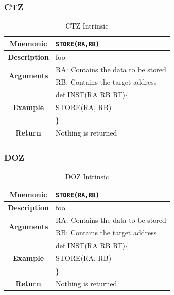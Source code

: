 \documentclass{article}
\begin{document}
\clearpage
\subsubsection{CTZ}
\label{sec:CTZ}

\begin{table}[h]
\begin{center}
\caption{CTZ Intrinsic}
\vspace{0.125in}
\label{tab:CTZIntrinsic}
\begin{tabular}{|c|l|}
\hline
\textbf{Mnemonic} & \texttt{STORE(RA,RB)}\\
\hline
\textbf{Description} & foo\\
\hline
\multirow{2}{*}{\textbf{Arguments}} & RA: Contains the data to be stored\\
                          			     & RB: Contains the target address \\
\hline
\multirow{3}{*}{\textbf{Example}} & def INST(RA RB RT)\{\\
                          			  &   STORE(RA, RB)\\
                                                    & \}\\
\hline
\textbf{Return} & Nothing is returned\\                                                    
\hline
\end{tabular}
\end{center}
\end{table}

\clearpage
\subsubsection{DOZ}
\label{sec:DOZ}

\begin{table}[h]
\begin{center}
\caption{DOZ Intrinsic}
\vspace{0.125in}
\label{tab:DOZIntrinsic}
\begin{tabular}{|c|l|}
\hline
\textbf{Mnemonic} & \texttt{STORE(RA,RB)}\\
\hline
\textbf{Description} & foo\\
\hline
\multirow{2}{*}{\textbf{Arguments}} & RA: Contains the data to be stored\\
                          			     & RB: Contains the target address \\
\hline
\multirow{3}{*}{\textbf{Example}} & def INST(RA RB RT)\{\\
                          			  &   STORE(RA, RB)\\
                                                    & \}\\
\hline
\textbf{Return} & Nothing is returned\\                                                    
\hline
\end{tabular}
\end{center}
\end{table}
\end{document}
